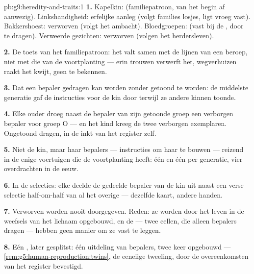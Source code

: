 \begin{solution}{pb:g9:heredity-and-traits:1}
\textbf{1.} Kapelkin:  (familiepatroon, van het begin
af aanwezig). Linkshandigheid: erfelijke aanleg (volgt families
losjes, ligt vroeg vast). Bakkershoest: verworven (volgt het
ambacht). Bloedgroepen:  (vast bij de , door
 te dragen). Verweerde gezichten: verworven
(volgen het herdersleven).

\textbf{2.} De toets van het familiepatroon: het  valt
samen met de lijnen van een beroep, niet met die van de
voortplanting --- erin trouwen verwerft het, wegverhuizen raakt
het kwijt, geen  te bekennen.

\textbf{3.} Dat een bepaler gedragen kan worden zonder getoond
te worden: de middelste generatie gaf de instructies voor de
kin door terwijl ze andere kinnen toonde.

\textbf{4.} Elke ouder droeg naast de bepaler van zijn getoonde
groep een verborgen bepaler voor groep O --- en het kind kreeg
de twee verborgen exemplaren. Ongetoond dragen, in de inkt van
het register zelf.

\textbf{5.} Niet de kin, maar haar bepalers --- instructies om
haar te bouwen --- reizend in de enige voertuigen die de
voortplanting heeft: één  en één  per generatie,
vier overdrachten in de eeuw.

\textbf{6.} In de selecties: elke  deelde de
gedeelde bepaler van de kin uit naast een verse selectie
half-om-half van al het overige --- dezelfde kaart, andere
handen.

\textbf{7.} Verworven  worden nooit doorgegeven.
Reden: ze worden door het leven in de weefsels van het lichaam
opgebouwd, en de  --- twee cellen, die alleen
bepalers dragen --- hebben geen manier om ze vast te leggen.

\textbf{8.} Eén , later gesplitst: één uitdeling
van bepalers, twee keer opgebouwd ---
\cref{rem:g5:human-reproduction:twins}, de eeneiige tweeling,
door de overeenkomsten van het register bevestigd.


\end{solution}
